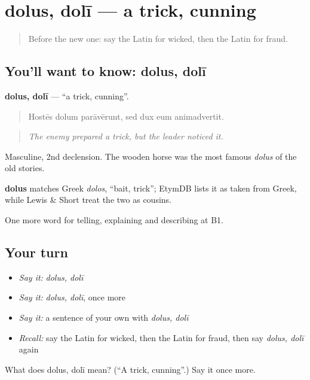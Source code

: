 \section[dolus, dolī]{dolus, dolī — a trick, cunning}

\label{lesson:LA-C305-dolus}



\begin{quote}
Before the new one: say the Latin for wicked, then the Latin for fraud.
\end{quote}

\subsection*{You'll want to know: dolus, dolī}
\textbf{dolus, dolī} — \textquotedblleft{}a trick, cunning\textquotedblright{}.

\begin{quote}
Hostēs dolum parāvērunt, sed dux eum animadvertit.
\end{quote}

\begin{quote}
\emph{The enemy prepared a trick, but the leader noticed it.}
\end{quote}

Masculine, 2nd declension. The wooden horse was the most famous \emph{dolus} of the old stories.

\begin{cousinweb}
\textbf{dolus} matches Greek \emph{dolos}, \textquotedblleft{}bait, trick\textquotedblright{}; EtymDB lists it as taken from Greek, while Lewis \& Short treat the two as cousins.
\end{cousinweb}

\begin{grammarlens}[title={What you've built}]
One more word for telling, explaining and describing at B1.
\end{grammarlens}

\subsection*{Your turn}
\begin{itemize}
\raggedright
  \item \emph{Say it:} \emph{dolus, dolī}
  \item \emph{Say it:} \emph{dolus, dolī}, once more
  \item \emph{Say it:} a sentence of your own with \emph{dolus, dolī}
  \item \emph{Recall:} say the Latin for wicked, then the Latin for fraud, then say \emph{dolus, dolī} again
\end{itemize}

\begin{tcolorbox}[breakable,colback=teal!4,colframe=teal!35!black,title={Before you move on}]
What does dolus, dolī mean? (\textquotedblleft{}A trick, cunning\textquotedblright{}.) Say it once more.
\end{tcolorbox}

